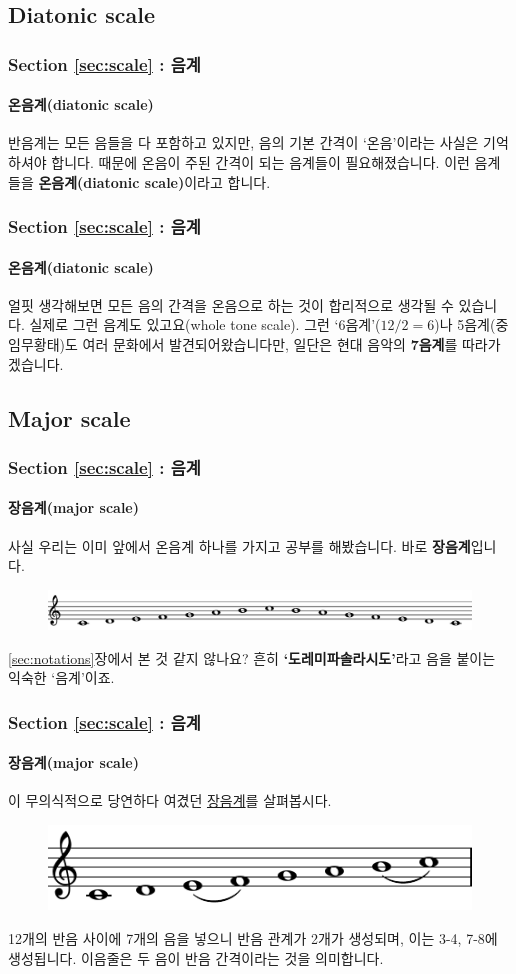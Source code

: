 \documentclass{beamer}
\begin{document}
	\subsection{Diatonic scale}
	\begin{frame}
		\frametitle{Section \ref{sec:scale} : 음계}
		\framesubtitle{온음계(diatonic scale)}
		반음계는 모든 음들을 다 포함하고 있지만, 음의 기본 간격이 `온음'이라는 사실은 기억하셔야 합니다. 때문에 온음이 주된 간격이 되는 음계들이 필요해졌습니다. 이런 음계들을 {\bf 온음계(diatonic scale)}이라고 합니다.
	\end{frame}
	
	\begin{frame}
		\frametitle{Section \ref{sec:scale} : 음계}
		\framesubtitle{온음계(diatonic scale)}
		얼핏 생각해보면 모든 음의 간격을 온음으로 하는 것이 합리적으로 생각될 수 있습니다. 실제로 그런 음계도 있고요(whole tone scale). 그런 `6음계'($ 12/2=6 $)나 5음계(중임무황태)도 여러 문화에서 발견되어왔습니다만, 일단은 현대 음악의 {\bf 7음계}를 따라가겠습니다.
	\end{frame}
	
	\subsection{Major scale}
	\begin{frame}
		\frametitle{Section \ref{sec:scale} : 음계}
		\framesubtitle{장음계(major scale)}
		사실 우리는 이미 앞에서 온음계 하나를 가지고 공부를 해봤습니다. 바로 {\bf 장음계}입니다.
		\begin{figure}[!h]
			\centering
			{\includegraphics[width=\textwidth]{res/pdf/4/syllable/doremi.pdf}}
		\end{figure}
		\ref{sec:notations}장에서 본 것 같지 않나요? 흔히 {\bf `도레미파솔라시도'}라고 음을 붙이는 익숙한 `음계'이죠.
	\end{frame}
	
	\begin{frame}
		\frametitle{Section \ref{sec:scale} : 음계}
		\framesubtitle{장음계(major scale)}
		이 무의식적으로 당연하다 여겼던 {\color{cyan}\href{run:res/mp3/7/scale/major_ascend.mp3}{장음계}}를 살펴봅시다. 
		\begin{figure}[!h]
			\centering
			{\includegraphics[width=\textwidth]{res/pdf/7/scale/major_ascend.pdf}}
		\end{figure}
		12개의 반음 사이에 7개의 음을 넣으니 반음 관계가 2개가 생성되며, 이는 3-4, 7-8에 생성됩니다. 이음줄은 두 음이 반음 간격이라는 것을 의미합니다.
	\end{frame}
	
\end{document}
